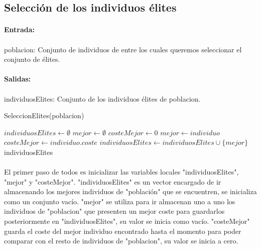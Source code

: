 	\subsection{Selección de los individuos élites}
	
	\paragraph{Entrada:}
	
	\paragraph{}poblacion: Conjunto de individuos de entre los cuales queremos seleccionar el conjunto de élites.
	
	\paragraph{Salidas:}
	
	\paragraph{}individuosElites: Conjunto de los individuos élites de poblacion.

	\begin{algorithm}[H]
		\caption{SeleccionElites(poblacion)}
		\begin{algorithmic}
			\STATE $individuosElites \leftarrow \emptyset$
			\STATE $mejor \leftarrow \emptyset$
			\STATE $costeMejor \leftarrow 0$
			\STATE $mejor \leftarrow individuo$
			\STATE $costeMejor \leftarrow individuo.coste$
			\ENDIF
			\ENDFOR
			\STATE $individuosElites \leftarrow individuosElites\cup\{mejor\}$
			\ENDWHILE
			\RETURN individuosElites
		\end{algorithmic}
	\end{algorithm}

	\paragraph{}El primer paso de todos es inicializar las variables locales "individuosElites", "mejor" y "costeMejor". "individuosElites" es un vector encargado de ir almacenando los mejores individuos de "población" que se encuentren, se inicializa como un conjunto vacío. "mejor" se utiliza para ir almacenan uno a uno los individuos de "poblacion" que presenten un mejor coste para guardarlos posteriormente en "individuosElites", su valor se inicia como vacío. "costeMejor" guarda el coste del mejor individuo encontrado hasta el momento para poder comparar con el resto de individuos de "poblacion", su valor se inicia a cero.
	
